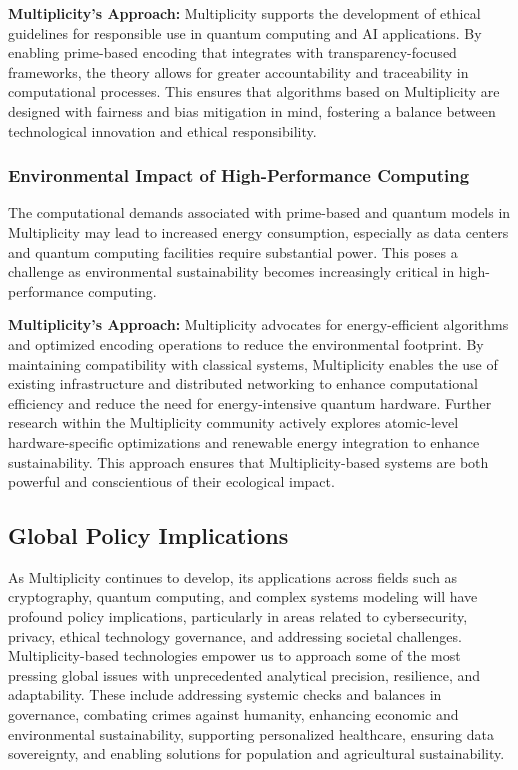 \documentclass{article}
\begin{document}
\textbf{Multiplicity’s Approach:} Multiplicity supports the development of ethical guidelines for responsible use in quantum computing and AI applications. By enabling prime-based encoding that integrates with transparency-focused frameworks, the theory allows for greater accountability and traceability in computational processes. This ensures that algorithms based on Multiplicity are designed with fairness and bias mitigation in mind, fostering a balance between technological innovation and ethical responsibility.

\subsubsection{Environmental Impact of High-Performance Computing}
The computational demands associated with prime-based and quantum models in Multiplicity may lead to increased energy consumption, especially as data centers and quantum computing facilities require substantial power. This poses a challenge as environmental sustainability becomes increasingly critical in high-performance computing.

\textbf{Multiplicity’s Approach:} Multiplicity advocates for energy-efficient algorithms and optimized encoding operations to reduce the environmental footprint. By maintaining compatibility with classical systems, Multiplicity enables the use of existing infrastructure and distributed networking to enhance computational efficiency and reduce the need for energy-intensive quantum hardware. Further research within the Multiplicity community actively explores atomic-level hardware-specific optimizations and renewable energy integration to enhance sustainability. This approach ensures that Multiplicity-based systems are both powerful and conscientious of their ecological impact.

\subsection{Global Policy Implications}

As Multiplicity continues to develop, its applications across fields such as cryptography, quantum computing, and complex systems modeling will have profound policy implications, particularly in areas related to cybersecurity, privacy, ethical technology governance, and addressing societal challenges. Multiplicity-based technologies empower us to approach some of the most pressing global issues with unprecedented analytical precision, resilience, and adaptability. These include addressing systemic checks and balances in governance, combating crimes against humanity, enhancing economic and environmental sustainability, supporting personalized healthcare, ensuring data sovereignty, and enabling solutions for population and agricultural sustainability.
\end{document}
